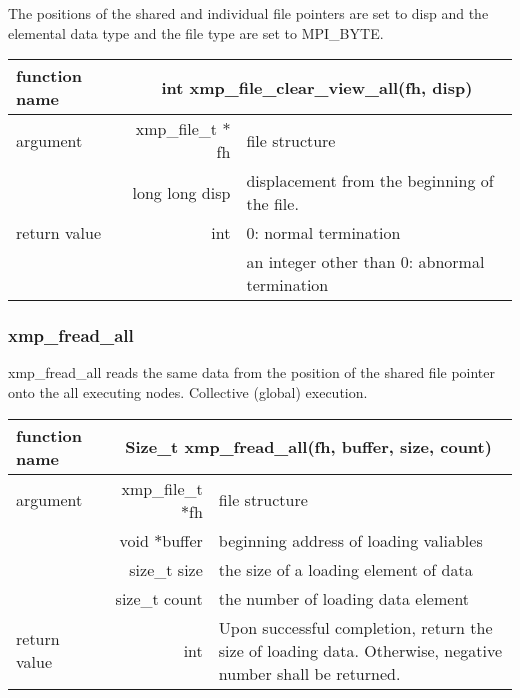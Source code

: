    The positions of the shared and individual file pointers are set to
   disp and 
   the elemental data type and the file type are set to MPI\_BYTE.
   
   \begin{table}[h]
    \begin{center}
     \begin{tabular}{|l|r|p{80mm}|}
      \hline
      {\bf function name}  & \multicolumn{2}{c|}{\bf int xmp\_file\_clear\_view\_all(fh,
      disp)} \\ \hline \hline
      argument & xmp\_file\_t $*$fh & file structure \\ \cline{2-3}
      & long long disp & displacement from the beginning of the file. \\ \hline
      return value & int & 0: normal termination \\
      &  & an integer other than 0: abnormal termination \\ \hline
      \end{tabular}
     \end{center}
    \label{tb:aaa}
   \end{table}

   \subsubsection{xmp\_fread\_all}
   xmp\_fread\_all reads the same data from the position of the shared file
   pointer onto the all executing nodes. Collective (global) execution.

   \clearpage

   \begin{table}[h]
    \begin{center}
     \begin{tabular}{|l|r|p{80mm}|}
      \hline
      {\bf function name}  & \multicolumn{2}{c|}{\bf Size\_t
      xmp\_fread\_all(fh, buffer, size, count)}  \\ \hline \hline
      argument & xmp\_file\_t $*$fh & file structure \\ \cline{2-3}
      & void $*$buffer & beginning address of loading valiables \\ \cline{2-3}
      & size\_t size & the size of a loading element of data \\ \cline{2-3}
      & size\_t count & the number of loading data element \\ \hline
      return value & int & Upon successful completion, return the size
	      of loading data. Otherwise, negative number shall be
	      returned. \\ \hline
      \end{tabular}
     \end{center}
    \label{tb:aaa}
   \end{table}

